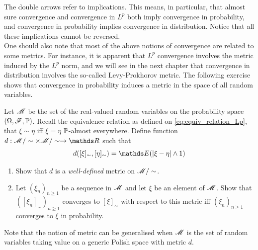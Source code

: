 

The double arrows refer to implications. This means, in particular, that almost sure convergence and convergence in $L^p$ both imply convergence in probability, and convergence in probability implies convergence in distribution. Notice that all these implications cannot be reversed.\\

One should also note that most of the above notions of convergence are related to some metrics. For instance, it is apparent that $L^p$ convergence involves the metric induced by the $L^p$ norm, and we will see in the next chapter that convergence in distribution involves the so-called Levy-Prokhorov metric. The following exercise shows that convergence in probability induces a metric in the space of all random variables.

\begin{exercise} \label{ex:metric_for_conv_in_prob}
Let $\mathcal{M}$ be the set of the real-valued random variables on the probability space $(\Omega,\mathcal{F},\mathbb{P})$. Recall the equivalence relation as defined on \eqref{eq:equiv_relation_Lp}, that $\xi\sim \eta$ iff $\xi=\eta$ $\mathbb{P}$-almost everywhere. Define function $d:\M/\sim \times \M/\sim \to \R$ such that
\begin{equation}
    d([\xi]_\sim, [\eta]_\sim) = \E(|\xi-\eta| \wedge 1)
\end{equation}
\begin{enumerate}
    \item Show that $d$ is a \textit{well-defined} metric on $\mathcal{M}/\sim$.
    \item Let $(\xi_n)_{n\geq 1}$ be a sequence in $\mathcal{M}$ and let $\xi$ be an element of $\mathcal{M}$. Show that $([\xi_n]_\sim)_{n\geq 1}$ converges to $[\xi]_\sim$ with respect to this metric iff $(\xi_n)_{n\geq 1}$ converges to $\xi$ in probability.
\end{enumerate}
Note that the notion of metric can be generalised when $\mathcal{M}$ is the set of random variables taking value on a generic Polish space with metric $d$.
\end{exercise}
\newpage